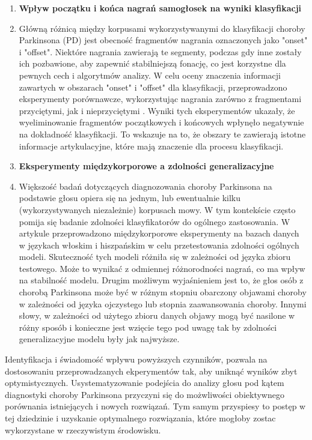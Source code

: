 \begin{enumerate}[label={\alph*)}]
	\item \textbf{Wpływ początku i końca  nagrań samogłosek na wyniki klasyfikacji}
\item[] Główną różnicą między korpusami wykorzystywanymi do klasyfikacji choroby Parkinsona (PD) jest obecność fragmentów nagrania oznaczonych jako "onset" i "offset".
Niektóre nagrania zawierają te segmenty, podczas gdy inne zostały ich pozbawione, aby zapewnić stabilniejszą fonację, co jest korzystne dla pewnych cech i algorytmów analizy.
W celu oceny znaczenia informacji zawartych w obszarach "onset" i "offset" dla klasyfikacji, przeprowadzono eksperymenty porównawcze,
wykorzystując nagrania zarówno z fragmentami przyciętymi, jak i nieprzyciętymi \cite{SustainedVowelsProblems}.
Wyniki tych eksperymentów ukazały, że wyeliminowanie fragmentów początkowych i końcowych wpłynęło negatywnie na dokładność klasyfikacji.
To wskazuje na to, że obszary te zawierają istotne informacje artykulacyjne, które mają znaczenie dla procesu klasyfikacji.

 	\item \textbf{Eksperymenty międzykorporowe a zdolności generalizacyjne}
	\item [] Większość badań dotyczących diagnozowania choroby Parkinsona na podstawie głosu opiera się na jednym, lub ewentualnie kilku (wykorzystywanych niezależnie)
korpusach mowy.
W tym kontekście często pomija się badanie zdolności klasyfikatorów do ogólnego zastosowania.
W artykule \cite{SustainedVowelsProblems} przeprowadzono międzykorporowe eksperymenty na bazach danych w językach włoskim i hiszpańskim w celu
przetestowania zdolności ogólnych modeli. Skuteczność tych modeli różniła się w zależności od języka zbioru testowego.
Może to wynikać z odmiennej różnorodności nagrań, co ma wpływ na stabilność modelu.
Drugim możliwym wyjaśnieniem jest to, że głos osób z chorobą Parkinsona może być w różnym stopniu obarczony objawami choroby w zależności od języka ojczystego lub stopnia zaawansowania choroby.
Innymi słowy, w zależności od użytego zbioru danych objawy mogą być nasilone w różny sposób i konieczne jest wzięcie tego pod uwagę tak by zdolności generalizacyjne modelu były jak najwyższe.
\end{enumerate}


Identyfikacja i świadomość wpływu powyższych czynników, pozwala na dostosowaniu przeprowadzanych ekperymentów tak, aby uniknąć wyników zbyt optymistycznych.
Usystematyzowanie podejścia do analizy głosu pod kątem diagnostyki choroby Parkinsona przyczyni się do możwliwości obiektywnego porównania istniejących i nowych rozwiązań.
Tym samym przyspiesy to postęp w tej dziedzinie i uzyskanie optymalnego rozwiązania, które mogłoby zostac wykorzystane w rzeczywistym środowisku.

